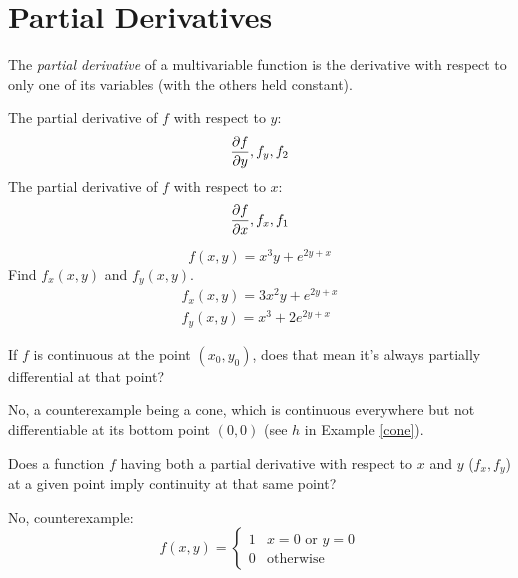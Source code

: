 \documentclass[00_complete]{subfiles}
\begin{document}
\section{Partial Derivatives}
\begin{definition}
    The \emph{partial derivative} of a multivariable function is the derivative
    with respect to only one of its variables (with the others held constant).
\end{definition}
\begin{symbols}
The partial derivative of $f$ with respect to $y$:
    $$\pdv{f}{y},f_y,f_2$$
The partial derivative of $f$ with respect to $x$:
    $$\pdv{f}{x},f_x,f_1$$
\end{symbols}
\begin{example}
    $$f(x,y)=x^3y+e^{2y+x}$$
    Find $f_x(x,y)$ and $f_y(x,y)$.
    \begin{gather*}
        f_x(x,y)=3x^2y+e^{2y+x} \\
        f_y(x,y)=x^3+2e^{2y+x}
    \end{gather*}
\end{example}
\begin{example}[Question 1]
If $f$ is continuous at the point $(x_0,y_0)$, does that mean it's always
partially differential at that point?
\begin{conclusion}
No, a counterexample being a cone, which is continuous everywhere but not
differentiable at its bottom point $(0,0)$ (see $h$ in Example \ref{cone}).
\end{conclusion}
\end{example}
\begin{example}[Question 2]
    Does a function $f$ having both a partial derivative with respect to $x$
    and $y$ ($f_x, f_y$) at a given point imply continuity at that same
    point?
    \begin{conclusion}
        No, counterexample:
        $$f(x,y) = \begin{cases}
            1 & x=0 \text{ or } y=0 \\
            0 & \text{otherwise}
        \end{cases}$$
    \end{conclusion}
\end{example}
\end{document}
